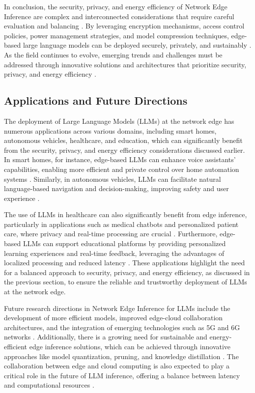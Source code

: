 \documentclass[11pt,a4paper]{article}
\begin{document}
In conclusion, the security, privacy, and energy efficiency of Network Edge Inference are complex and interconnected considerations that require careful evaluation and balancing \cite{doi:10.1109/access.2024.3351308}. By leveraging encryption mechanisms, access control policies, power management strategies, and model compression techniques, edge-based large language models can be deployed securely, privately, and sustainably \cite{arxiv:2409.14961}. As the field continues to evolve, emerging trends and challenges must be addressed through innovative solutions and architectures that prioritize security, privacy, and energy efficiency \cite{doi:10.32996/jcsts.2025.7.4.38}.


\subsection{Applications and Future Directions}


The deployment of Large Language Models (LLMs) at the network edge has numerous applications across various domains, including smart homes, autonomous vehicles, healthcare, and education, which can significantly benefit from the security, privacy, and energy efficiency considerations discussed earlier. In smart homes, for instance, edge-based LLMs can enhance voice assistants' capabilities, enabling more efficient and private control over home automation systems \cite{doi:10.1145/3466752.3480095}. Similarly, in autonomous vehicles, LLMs can facilitate natural language-based navigation and decision-making, improving safety and user experience \cite{arxiv:2103.00768}. 

The use of LLMs in healthcare can also significantly benefit from edge inference, particularly in applications such as medical chatbots and personalized patient care, where privacy and real-time processing are crucial \cite{doi:10.1109/icmla58977.2023.00104}. Furthermore, edge-based LLMs can support educational platforms by providing personalized learning experiences and real-time feedback, leveraging the advantages of localized processing and reduced latency \cite{arxiv:2409.00088}. These applications highlight the need for a balanced approach to security, privacy, and energy efficiency, as discussed in the previous section, to ensure the reliable and trustworthy deployment of LLMs at the network edge.

Future research directions in Network Edge Inference for LLMs include the development of more efficient models, improved edge-cloud collaboration architectures, and the integration of emerging technologies such as 5G and 6G networks \cite{doi:10.1109/vtc2024-spring62846.2024.10683177}. Additionally, there is a growing need for sustainable and energy-efficient edge inference solutions, which can be achieved through innovative approaches like model quantization, pruning, and knowledge distillation \cite{doi:10.1145/3767742}. The collaboration between edge and cloud computing is also expected to play a critical role in the future of LLM inference, offering a balance between latency and computational resources \cite{doi:10.3390/electronics12173598}.
\end{document}

